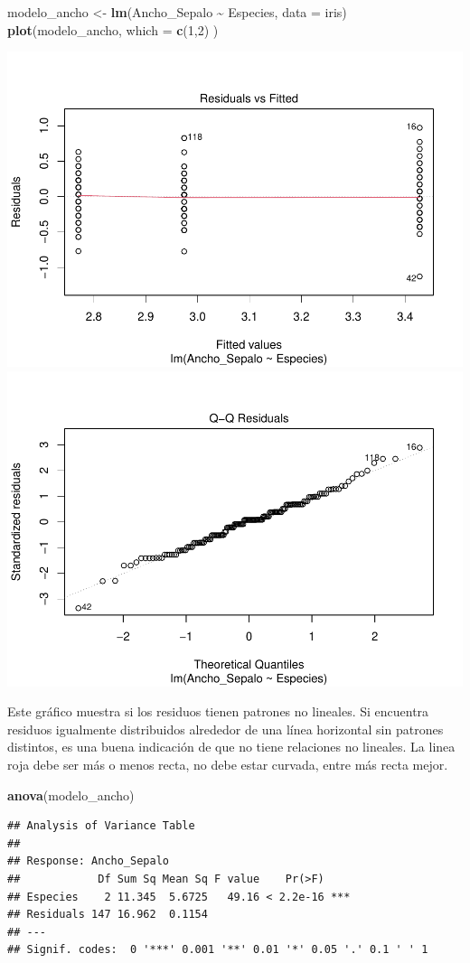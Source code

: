 \documentclass[
]{book}
\newenvironment{Shaded}{\begin{snugshade}}{\end{snugshade}}
\newcommand{\AttributeTok}[1]{\textcolor[rgb]{0.13,0.29,0.53}{#1}}
\newcommand{\DecValTok}[1]{\textcolor[rgb]{0.00,0.00,0.81}{#1}}
\newcommand{\FunctionTok}[1]{\textcolor[rgb]{0.13,0.29,0.53}{\textbf{#1}}}
\newcommand{\NormalTok}[1]{#1}
\newcommand{\OtherTok}[1]{\textcolor[rgb]{0.56,0.35,0.01}{#1}}
\newcommand{\SpecialCharTok}[1]{\textcolor[rgb]{0.81,0.36,0.00}{\textbf{#1}}}
\begin{document}
\begin{Shaded}
\begin{Highlighting}[]
\NormalTok{modelo\_ancho }\OtherTok{\textless{}{-}} \FunctionTok{lm}\NormalTok{(Ancho\_Sepalo }\SpecialCharTok{\textasciitilde{}}\NormalTok{ Especies, }\AttributeTok{data =}\NormalTok{ iris) }
\FunctionTok{plot}\NormalTok{(modelo\_ancho, }\AttributeTok{which =} \FunctionTok{c}\NormalTok{(}\DecValTok{1}\NormalTok{,}\DecValTok{2}\NormalTok{) )}
\end{Highlighting}
\end{Shaded}

\includegraphics[width=0.45\linewidth]{_main_files/figure-latex/unnamed-chunk-255-1}
\includegraphics[width=0.45\linewidth]{_main_files/figure-latex/unnamed-chunk-255-2}

Este gráfico muestra si los residuos tienen patrones no lineales.
Si encuentra residuos igualmente distribuidos alrededor de una línea horizontal sin patrones distintos, es una buena indicación de que no tiene relaciones no lineales.
La linea roja debe ser más o menos recta, no debe estar curvada, entre más recta mejor.

\begin{Shaded}
\begin{Highlighting}[]
\FunctionTok{anova}\NormalTok{(modelo\_ancho)}
\end{Highlighting}
\end{Shaded}

\begin{verbatim}
## Analysis of Variance Table
## 
## Response: Ancho_Sepalo
##            Df Sum Sq Mean Sq F value    Pr(>F)    
## Especies    2 11.345  5.6725   49.16 < 2.2e-16 ***
## Residuals 147 16.962  0.1154                      
## ---
## Signif. codes:  0 '***' 0.001 '**' 0.01 '*' 0.05 '.' 0.1 ' ' 1
\end{verbatim}
\end{document}
